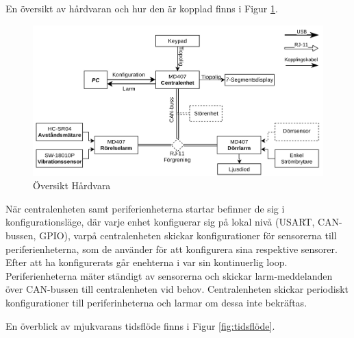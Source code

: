 \documentclass{article}
\begin{document}
En översikt av hårdvaran och hur den är kopplad finns i Figur \ref{fig:hårdvara}.
\begin{figure}[H] %
    \centering
    \includegraphics[width=1\textwidth]{figurer/HardvaraOversikt.jpg}
    \caption{Översikt Hårdvara}
    \label{fig:hårdvara}
\end{figure}

När centralenheten samt periferienheterna startar befinner de sig i konfigurationsläge,
 där varje enhet konfiguerar sig på lokal nivå
 (USART, CAN-bussen, GPIO), varpå centralenheten skickar konfigurationer
  för sensorerna till periferienheterna, som de använder för att konfigurera sina respektive sensorer. Efter att ha konfigurerats går enehterna i var sin kontinuerlig loop. Periferienheterna mäter ständigt av sensorerna och skickar larm-meddelanden över CAN-bussen till centralenheten vid behov. Centralenheten skickar periodiskt konfigurationer till periferinheterna och larmar om dessa inte bekräftas.

En överblick av mjukvarans tidsflöde finns i Figur \ref{fig:tidsflöde}.
\end{document}
